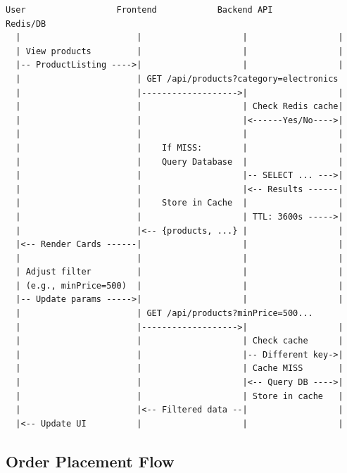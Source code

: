 \documentclass[12pt,a4paper]{report}
\begin{document}
\begin{lstlisting}[language=text, caption=Product Search and Filtering Flow]
User                  Frontend            Backend API          Redis/DB
  |                       |                    |                  |
  | View products         |                    |                  |
  |-- ProductListing ---->|                    |                  |
  |                       | GET /api/products?category=electronics
  |                       |------------------->|                  |
  |                       |                    | Check Redis cache|
  |                       |                    |<------Yes/No---->|
  |                       |                    |                  |
  |                       |    If MISS:        |                  |
  |                       |    Query Database  |                  |
  |                       |                    |-- SELECT ... --->|
  |                       |                    |<-- Results ------| 
  |                       |    Store in Cache  |                  |
  |                       |                    | TTL: 3600s ----->|
  |                       |<-- {products, ...} |                  |
  |<-- Render Cards ------|                    |                  |
  |                       |                    |                  |
  | Adjust filter         |                    |                  |
  | (e.g., minPrice=500)  |                    |                  |
  |-- Update params ----->|                    |                  |
  |                       | GET /api/products?minPrice=500...
  |                       |------------------->|                  |
  |                       |                    | Check cache      |
  |                       |                    |-- Different key->|
  |                       |                    | Cache MISS       |
  |                       |                    |<-- Query DB ---->|
  |                       |                    | Store in cache   |
  |                       |<-- Filtered data --|                  |
  |<-- Update UI          |                    |                  |
\end{lstlisting}

\subsection{Order Placement Flow}
\end{document}
